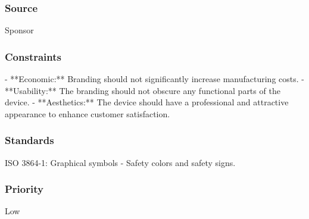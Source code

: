 \subsubsection{Source}
Sponsor
\subsubsection{Constraints}
- **Economic:** Branding should not significantly increase manufacturing costs.
- **Usability:** The branding should not obscure any functional parts of the device.
- **Aesthetics:** The device should have a professional and attractive appearance to enhance customer satisfaction.
\subsubsection{Standards}
ISO 3864-1: Graphical symbols - Safety colors and safety signs.
\subsubsection{Priority}
Low
